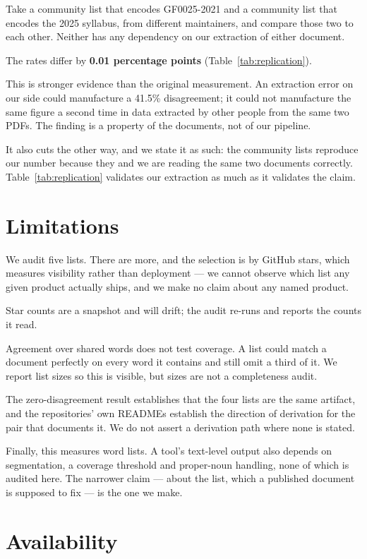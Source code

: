 \documentclass[11pt]{article}
\begin{document}
Take a community list that encodes GF0025-2021 and a community list that encodes
the 2025 syllabus, from different maintainers, and compare those two to each
other. Neither has any dependency on our extraction of either document.

The rates differ by \textbf{0.01 percentage points} (Table~\ref{tab:replication}).

This is stronger evidence than the original measurement. An extraction error on
our side could manufacture a 41.5\% disagreement; it could not manufacture the
same figure a second time in data extracted by other people from the same two
PDFs. The finding is a property of the documents, not of our pipeline.

It also cuts the other way, and we state it as such: the community lists
reproduce our number because they and we are reading the same two documents
correctly. Table~\ref{tab:replication} validates our extraction as much as it
validates the claim.

\section{Limitations}

We audit five lists. There are more, and the selection is by GitHub stars, which
measures visibility rather than deployment --- we cannot observe which list any
given product actually ships, and we make no claim about any named product.

Star counts are a snapshot and will drift; the audit re-runs and reports the
counts it read.

Agreement over shared words does not test coverage. A list could match a
document perfectly on every word it contains and still omit a third of it. We
report list sizes so this is visible, but sizes are not a completeness audit.

The zero-disagreement result establishes that the four lists are the same
artifact, and the repositories' own READMEs establish the direction of
derivation for the pair that documents it. We do not assert a derivation path
where none is stated.

Finally, this measures word lists. A tool's text-level output also depends on
segmentation, a coverage threshold and proper-noun handling, none of which is
audited here. The narrower claim --- about the list, which a published document
is supposed to fix --- is the one we make.

\section*{Availability}
\end{document}
